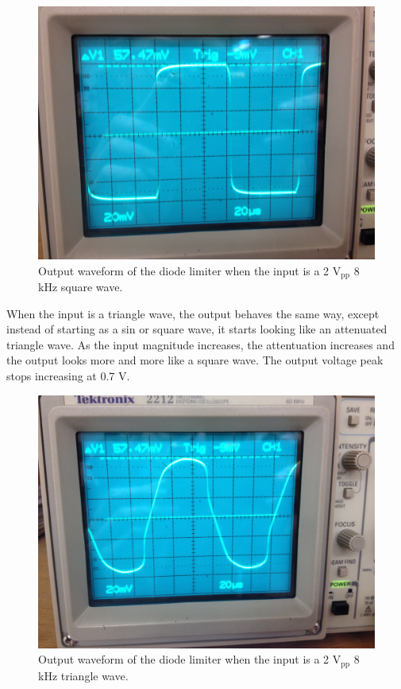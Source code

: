 \documentclass[12pt,letterpaper]{report}
\newlength \figwidth
\begin{document}
\begin{figure}[H]
\centering
\includegraphics[width=\figwidth, keepaspectratio=true]{lab4/3_7_2.jpg}
\caption{Output waveform of the diode limiter when the input is a 2 $\text{V}_{\text{pp}}$ 8 kHz square wave.}
\label{fig:3_7_2}
\end{figure}

When the input is a triangle wave, the output behaves the same way, except instead of starting as a sin or square wave, it starts looking like an attenuated triangle wave. As the input magnitude increases, the attentuation increases and the output looks more and more like a square wave. The output voltage peak stops increasing at 0.7 V.

\begin{figure}[H]
\centering
\includegraphics[width=\figwidth, keepaspectratio=true]{lab4/3_7_3.jpg}
\caption{Output waveform of the diode limiter when the input is a 2 $\text{V}_{\text{pp}}$ 8 kHz triangle wave.}
\label{fig:3_7_3}
\end{figure}
\end{document}
